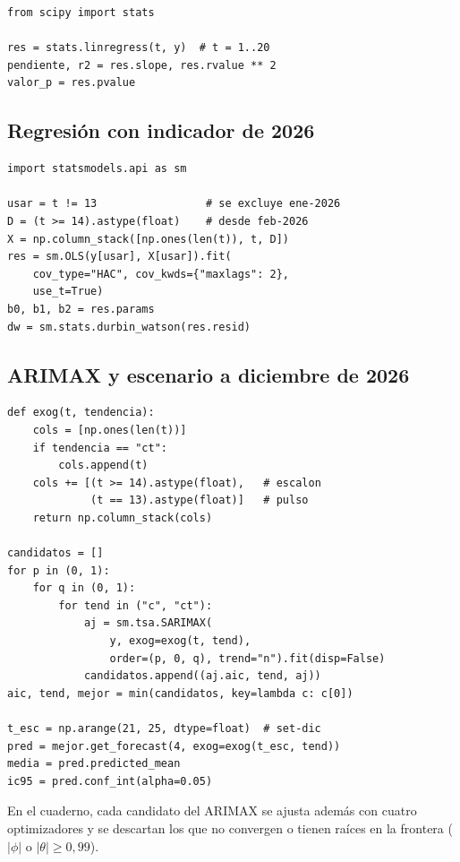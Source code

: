 \documentclass[conference]{IEEEtran}
\begin{document}
{\scriptsize
\begin{verbatim}
from scipy import stats

res = stats.linregress(t, y)  # t = 1..20
pendiente, r2 = res.slope, res.rvalue ** 2
valor_p = res.pvalue
\end{verbatim}
}

\subsection{Regresi\'on con indicador de 2026}

{\scriptsize
\begin{verbatim}
import statsmodels.api as sm

usar = t != 13                 # se excluye ene-2026
D = (t >= 14).astype(float)    # desde feb-2026
X = np.column_stack([np.ones(len(t)), t, D])
res = sm.OLS(y[usar], X[usar]).fit(
    cov_type="HAC", cov_kwds={"maxlags": 2},
    use_t=True)
b0, b1, b2 = res.params
dw = sm.stats.durbin_watson(res.resid)
\end{verbatim}
}

\subsection{ARIMAX y escenario a diciembre de 2026}

{\scriptsize
\begin{verbatim}
def exog(t, tendencia):
    cols = [np.ones(len(t))]
    if tendencia == "ct":
        cols.append(t)
    cols += [(t >= 14).astype(float),   # escalon
             (t == 13).astype(float)]   # pulso
    return np.column_stack(cols)

candidatos = []
for p in (0, 1):
    for q in (0, 1):
        for tend in ("c", "ct"):
            aj = sm.tsa.SARIMAX(
                y, exog=exog(t, tend),
                order=(p, 0, q), trend="n").fit(disp=False)
            candidatos.append((aj.aic, tend, aj))
aic, tend, mejor = min(candidatos, key=lambda c: c[0])

t_esc = np.arange(21, 25, dtype=float)  # set-dic
pred = mejor.get_forecast(4, exog=exog(t_esc, tend))
media = pred.predicted_mean
ic95 = pred.conf_int(alpha=0.05)
\end{verbatim}
}

En el cuaderno, cada candidato del ARIMAX se ajusta adem\'as con cuatro optimizadores y se descartan los que no convergen o tienen ra\'ices en la frontera ($|\phi|$ o $|\theta| \geq 0{,}99$).
\end{document}
